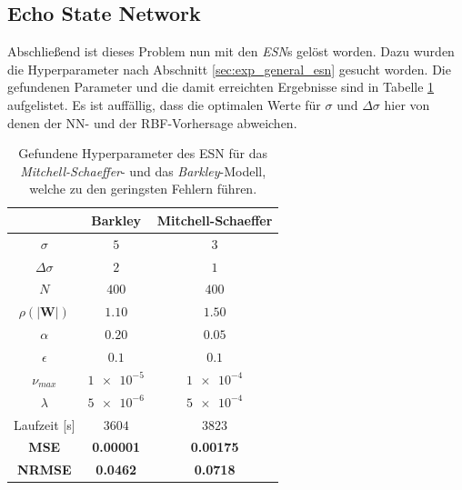 \subsection{Echo State Network}
Abschließend ist dieses Problem nun mit den \textit{ESN}s gelöst worden. Dazu wurden die Hyperparameter nach Abschnitt \ref{sec:exp_general_esn} gesucht worden. Die gefundenen Parameter und die damit erreichten Ergebnisse sind in Tabelle \ref{tab:exp_cross_esn_results} aufgelistet. Es ist auffällig, dass die optimalen Werte für $\sigma$ und $\Delta \sigma$ hier von denen der NN- und der RBF-Vorhersage abweichen.
\begin{table}[h]
	\centering
	\captionsetup{width=0.9\linewidth}
	\begin{tabular}{|c|c|c|}
		\multicolumn{1}{c|}{} &  Barkley & Mitchell-Schaeffer \\ 
		\hline \hline 
		\rule[-1ex]{0pt}{2.5ex} $\sigma$ & $5$ & $3$ \\ 
		\hline 
		\rule[-1ex]{0pt}{2.5ex} $\Delta \sigma$ & $2$ & $1$ \\ 
		\hline 
		\rule[-1ex]{0pt}{3.5ex} $N$ & $400$ & $400$ \\ 
		\hline 
		\rule[-1ex]{0pt}{3.5ex} $\rho(|\mathbf{W}|)$ & $1.10$ & $1.50$\\ 
		\hline 
		\rule[-1ex]{0pt}{3.5ex} $\alpha$ & $0.20$ & $0.05$ \\ 
		\hline 
		\rule[-1ex]{0pt}{3.5ex} $\epsilon$ & $0.1$ & $0.1$ \\ 
		\hline 
		\rule[-1ex]{0pt}{3.5ex} $\nu_{max}$ & $\num{1e-5}$ & $\num{1e-4}$\\ 
		\hline 
		\rule[-1ex]{0pt}{3.5ex} $\lambda$ & $\num{5e-6}$ & $\num{5e-4}$\\ 
		\hline 
		\rule[-1ex]{0pt}{2.5ex} Laufzeit [s] & $3604$ & $3823$ \\ 
		\hline 
		\rule[-1ex]{0pt}{2.5ex} \textbf{MSE} & \textbf{0.00001} & \textbf{0.00175} \\ 
		\hline
		\rule[-1ex]{0pt}{2.5ex} \textbf{NRMSE} & \textbf{0.0462} & \textbf{0.0718} \\ 
		\hline 
	\end{tabular} 
	\caption{Gefundene Hyperparameter des \textsc{ESN} für das \textit{Mitchell-Schaeffer}- und das \textit{Barkley}-Modell, welche zu den geringsten Fehlern führen.}
	\label{tab:exp_cross_esn_results}
\end{table}

\FloatBarrier
